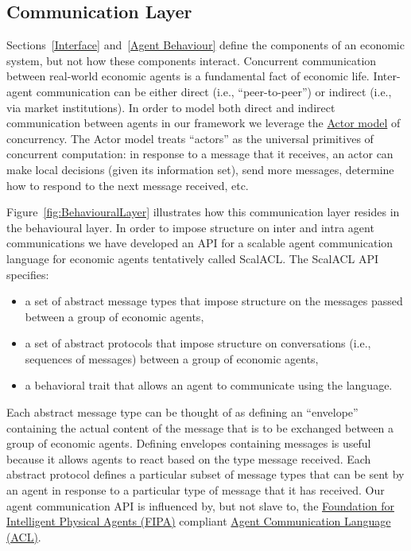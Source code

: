 \documentclass[a4paper]{article}
\begin{document}
\subsection{Communication Layer}
\label{CommunicationLayer}

Sections~\ref{Interface} and~\ref{Agent Behaviour} define the components of an economic system, but not how these components interact. Concurrent communication between real-world economic agents is a fundamental fact of economic life. Inter-agent communication can be either direct (i.e., ``peer-to-peer'') or indirect (i.e., via market institutions). In order to model both direct and indirect communication between agents in our framework we leverage the \href{https://en.wikipedia.org/wiki/Actor_model}{Actor model} of concurrency. The Actor model treats ``actors'' as the universal primitives of concurrent computation: in response to a message that it receives, an actor can make local decisions (given its information set), send more messages, determine how to respond to the next message received, etc.

Figure~\ref{fig:BehaviouralLayer} illustrates how this communication layer resides in the behavioural layer. In order to impose structure on inter and intra agent communications we have developed an API for a scalable agent communication language for economic agents tentatively called ScalACL. The ScalACL API specifies:

\begin{itemize}
    \item a set of abstract message types that impose structure on the messages passed between a group of economic agents,
    \item a set of abstract protocols that impose structure on conversations (i.e., sequences of messages) between a group of economic agents,
    \item a behavioral trait that allows an agent to communicate using the language.
\end{itemize}
Each abstract message type can be thought of as defining an ``envelope'' containing the actual content of the message that is to be exchanged between a group of economic agents. Defining envelopes containing messages is useful because it allows agents to react based on the type message received. Each abstract protocol defines a particular subset of message types that can be sent by an agent in response to a particular type of message that it has received. Our agent communication API is influenced by, but not slave to, the \href{http://www.fipa.org/}{Foundation for Intelligent Physical Agents (FIPA)} compliant \href{http://www.fipa.org/specs/fipa00037/SC00037J.pdf}{Agent Communication Language (ACL)}.
\end{document}
